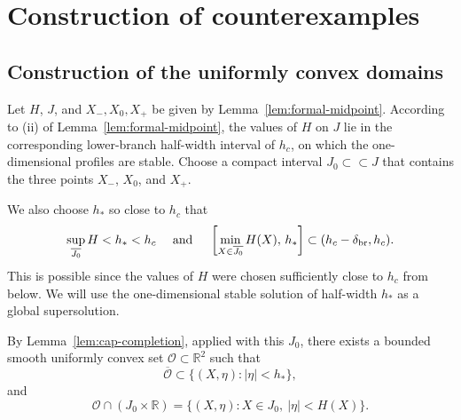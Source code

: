 \documentclass[reqno,12pt]{amsart}
\numberwithin{equation}{section}
\theoremstyle{remark}
\begin{document}
\section{Construction of counterexamples}

\subsection{Construction of the uniformly convex domains}\label{sec:domains}

Let $H$, $J$, and $X_-,X_0,X_+$ be given by Lemma~\ref{lem:formal-midpoint}.  According to (ii) of Lemma~\ref{lem:formal-midpoint}, the values of $H$ on $J$ lie in the corresponding lower-branch half-width interval of $h_c$,  on which the one-dimensional
profiles are stable.  Choose a compact interval $J_0\subset\subset J$ that contains the
three points $X_-$, $X_0$, and $X_+$.

We also choose $h_*$ so close to $h_c$ that 
\begin{equation}\label{eq:h-star} 
\sup_{\overline{J_0}}H<h_*<h_c \quad  \text{ and } \quad
\left[\min_{X\in\overline{J_0}}H(X),\,h_*\right]
\subset (h_c-\delta_{\rm br},h_c).    
\end{equation}
This is possible since the values of $H$ were chosen sufficiently close to $h_c$ from below.
We will use the one-dimensional stable solution of half-width $h_*$ as a global supersolution.


By Lemma~\ref{lem:cap-completion}, applied with this $J_0$, there exists a bounded smooth uniformly convex set
$\mathcal O\subset\mathbb R^2$ such that
\begin{equation}\label{eq:O-inside-strip}
\overline{\mathcal O}\subset\{(X,\eta):|\eta|<h_*\},
\end{equation}
and
\begin{equation}\label{eq:O-exact-channel}
\mathcal O\cap (J_0\times\mathbb R)
=
\{(X,\eta):X\in J_0,\ |\eta|<H(X)\}.
\end{equation}
\end{document}
